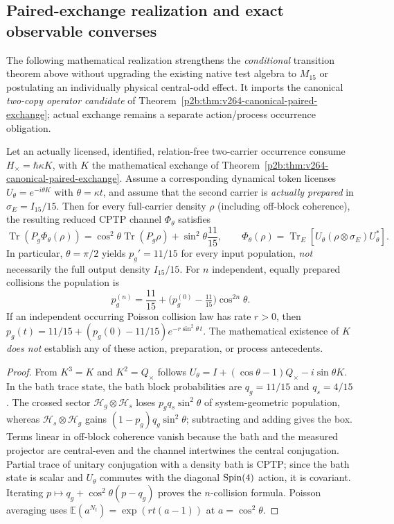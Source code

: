 \documentclass[12pt,a4paper]{article}
\begin{document}
\subsection{Paired-exchange realization and exact observable converses}
\label{p4:sec:v264-paired-population}
\noindent
The following mathematical realization strengthens the \emph{conditional}
transition theorem above without upgrading the existing native test algebra
to $M_{15}$ or postulating an individually physical central-odd effect.
It imports the canonical \emph{two-copy operator candidate} of
Theorem~\ref{p2b:thm:v264-canonical-paired-exchange}; actual exchange
remains a separate action/process occurrence obligation.

\begin{theorem}
\label{p4:thm:v264-paired-population-law}
Let an actually licensed, identified, relation-free two-carrier occurrence
consume $H_{\times}=\hbar\kappa K$, with $K$ the mathematical
exchange of Theorem~\ref{p2b:thm:v264-canonical-paired-exchange}.
Assume a corresponding dynamical token licenses
$U_\theta=e^{-i\theta K}$ with $\theta=\kappa t$, and assume
that the second carrier is \emph{actually prepared} in
$\sigma_E=I_{15}/15$.  Then for every full-carrier density
$\rho$ (including off-block coherence), the resulting reduced CPTP
channel $\Phi_\theta$ satisfies
\[
\boxed{\operatorname{Tr}(P_g\Phi_\theta(\rho))
  =\cos^2\theta\operatorname{Tr}(P_g\rho)
   +\sin^2\theta\frac{11}{15}},
\qquad
\Phi_\theta(\rho)=\operatorname{Tr}_E\!\left[
 U_\theta(\rho\otimes\sigma_E)U_\theta^*\right].
\]
In particular, $\theta=\pi/2$ yields $p_g'=11/15$ for every input
population, \emph{not} necessarily the full output density $I_{15}/15$.
For $n$ independent, equally prepared collisions the population is
\[
 p_g^{(n)}=\frac{11}{15}+
  \bigl(p_g^{(0)}-\tfrac{11}{15}\bigr)\cos^{2n}\theta.
\]
If an independent occurring Poisson collision law has rate $r>0$,
then $p_g(t)=11/15+(p_g(0)-11/15)e^{-r\sin^2\theta\,t}$.
The mathematical existence of $K$ \emph{does not} establish any of
these action, preparation, or process antecedents.
\end{theorem}
\begin{proof}
From $K^3=K$ and $K^2=Q_{\times}$ follows
$U_\theta=I+(\cos\theta-1)Q_{\times}-i\sin\theta K$.
In the bath trace state, the bath block probabilities are
$q_g=11/15$ and $q_s=4/15$. The crossed sector
$\mathcal H_g\otimes\mathcal H_s$ loses
$p_gq_s\sin^2\theta$ of system-geometric population, whereas
$\mathcal H_s\otimes\mathcal H_g$ gains
$(1-p_g)q_g\sin^2\theta$; subtracting and adding gives the box.
Terms linear in off-block coherence vanish because the bath and the
measured projector are central-even and the channel intertwines the
central conjugation. Partial trace of unitary conjugation with a
density bath is CPTP; since the bath state is scalar and $U_\theta$
commutes with the diagonal $\mathrm{Spin}(4)$ action, it is covariant.
Iterating $p\mapsto q_g+\cos^2\theta(p-q_g)$ proves the $n$-collision
formula. Poisson averaging uses
$\mathbb E(a^{N_t})=\exp(rt(a-1))$ at $a=\cos^2\theta$.
\end{proof}
\end{document}
